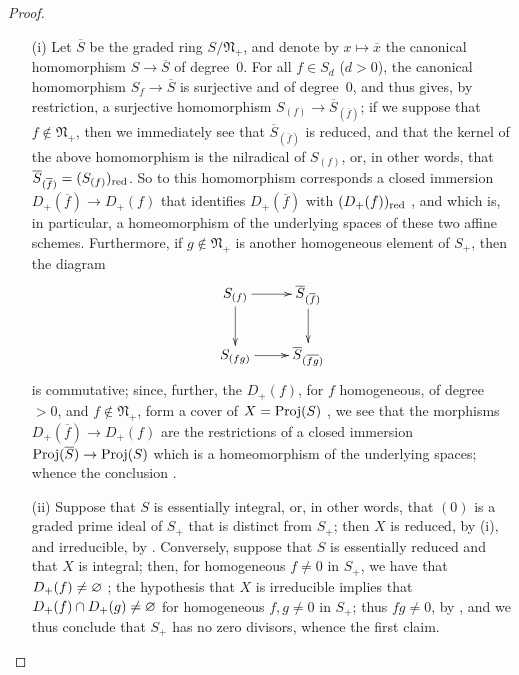 \begin{proof}
\begin{enumerate}
  \item[{\rm(i)}] Let $\overline{S}$ be the graded ring $S/\mathfrak{N}_+$, and denote by $x\mapsto\overline{x}$ the canonical homomorphism $S\to\overline{S}$ of degree~$0$.
    For all $f\in S_d$ ($d>0$), the canonical homomorphism $S_f\to\overline{S}$  is surjective and of degree~$0$, and thus gives, by restriction, a surjective homomorphism $S_{(f)}\to\overline{S}_{(\overline{f})}$;
    if we suppose that $f\not\in\mathfrak{N}_+$, then we immediately see that $\overline{S}_{(\overline{f})}$  is reduced, and that the kernel of the above homomorphism is the nilradical of $S_{(f)}$, or, in other words, that $\overline{S}_{(\overline{f})}=(S_{(f)})_{\mathrm{red}}$.
    So to this homomorphism corresponds a closed immersion $D_+(\overline{f})\to D_+(f)$ that identifies $D_+(\overline{f})$ with $(D_+(f))_{\mathrm{red}}$ , and which is, in particular, a homeomorphism of the underlying spaces of these two affine schemes.
    Furthermore, if $g\not\in\mathfrak{N}_+$ is another homogeneous element of $S_+$, then the diagram
    \[
      \xymatrix{
        S_{(f)} \ar[r] \ar[d]
        & \overline{S}_{(\overline{f})} \ar[d]
      \\S_{(fg)} \ar[r]
        & \overline{S}_{(\overline{fg})}
      }
    \]
    is commutative;
    since, further, the $D_+(f)$, for $f$ homogeneous, of degree $>0$, and $f\not\in\mathfrak{N}_+$, form a cover of $X=\operatorname{Proj}(S)$ , we see that the morphisms $D_+(\overline{f})\to D_+(f)$ are the restrictions of a closed immersion $\Proj(\overline{S})\to\Proj(S)$ which is a homeomorphism of the underlying spaces;
    whence the conclusion .
  \item[{\rm(ii)}] Suppose that $S$ is essentially integral, or, in other words, that $(0)$ is a graded prime ideal of $S_+$ that is distinct from $S_+$;
    then $X$ is reduced, by (i), and irreducible, by .
    Conversely, suppose that $S$ is essentially reduced and that $X$ is integral;
    then, for homogeneous $f\neq0$ in $S_+$, we have that $D_+(f)\neq\varnothing$ ;
    the hypothesis that $X$ is irreducible implies that $D_+(f)\cap D_+(g)\neq\varnothing$ for homogeneous $f,g\neq0$ in $S_+$;
    thus $fg\neq0$, by , and we thus conclude that $S_+$ has no zero divisors, whence the first claim.
\end{enumerate}
\end{proof}

